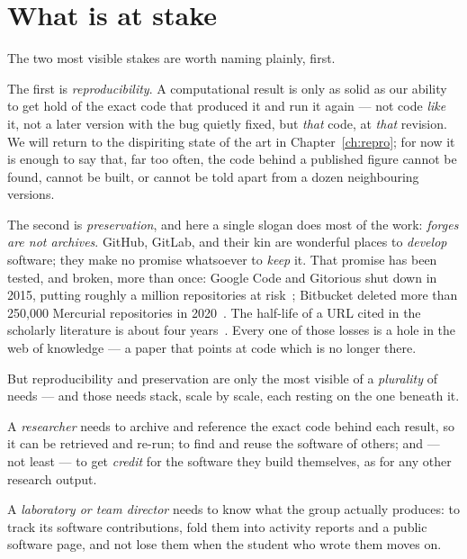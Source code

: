 \section{What is at stake}

The two most visible stakes are worth naming plainly, first.

The first is \emph{reproducibility}. A computational result is only as solid as our ability to
get hold of the exact code that produced it and run it again --- not code \emph{like} it, not a
later version with the bug quietly fixed, but \emph{that} code, at \emph{that} revision. We will
return to the dispiriting state of the art in Chapter~\ref{ch:repro}; for now it is enough to
say that, far too often, the code behind a published figure cannot be found, cannot be built, or
cannot be told apart from a dozen neighbouring versions.

The second is \emph{preservation}, and here a single slogan does most of the work: \emph{forges
are not archives}. GitHub, GitLab, and their kin are wonderful places to \emph{develop}
software; they make no promise whatsoever to \emph{keep} it. That promise has been tested, and
broken, more than once: Google Code and Gitorious shut down in 2015, putting roughly a million
repositories at risk~\autocite{google-code-shutdown,gitorious-shutdown}; Bitbucket deleted more
than 250,000 Mercurial repositories in 2020~\autocite{bitbucket-mercurial-sunset}. The
half-life of a URL cited in the scholarly literature is about four years~\autocite{spinellis2003decay}. Every one of those
losses is a hole in the web of knowledge --- a paper that points at code which is no longer
there.


But reproducibility and preservation are only the most visible of a \emph{plurality} of needs ---
and those needs stack, scale by scale, each resting on the one beneath it.

A \emph{researcher} needs to archive and reference the exact code behind each result, so it can be
retrieved and re-run; to find and reuse the software of others; and --- not least --- to get
\emph{credit} for the software they build themselves, as for any other research output.

A \emph{laboratory or team director} needs to know what the group actually produces: to track its
software contributions, fold them into activity reports and a public software page, and not lose
them when the student who wrote them moves on.


